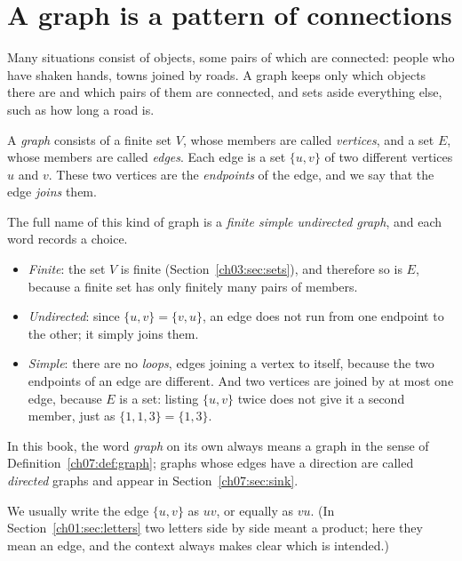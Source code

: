\section{A graph is a pattern of connections}\label{ch07:sec:graph}
Many situations consist of objects, some pairs of which are connected: people who have shaken hands, towns joined by roads. A graph keeps only which objects there are and which pairs of them are connected, and sets aside everything else, such as how long a road is.

\par\noindent\begin{minipage}{\linewidth}
\begin{definition}[Graph]\label{ch07:def:graph}
A \emph{graph} consists of a finite set $V$, whose members are called \emph{vertices}, and a set $E$, whose members are called \emph{edges}. Each edge is a set $\{u,v\}$ of two different vertices $u$ and $v$. These two vertices are the \emph{endpoints} of the edge, and we say that the edge \emph{joins} them.
\end{definition}
\end{minipage}\par

The full name of this kind of graph is a \emph{finite simple undirected graph}, and each word records a choice.
\begin{itemize}
\item \emph{Finite}: the set $V$ is finite (Section~\ref{ch03:sec:sets}), and therefore so is $E$, because a finite set has only finitely many pairs of members.
\item \emph{Undirected}: since $\{u,v\}=\{v,u\}$, an edge does not run from one endpoint to the other; it simply joins them.
\item \emph{Simple}: there are no \emph{loops}, edges joining a vertex to itself, because the two endpoints of an edge are different. And two vertices are joined by at most one edge, because $E$ is a set: listing $\{u,v\}$ twice does not give it a second member, just as $\{1,1,3\}=\{1,3\}$.
\end{itemize}
In this book, the word \emph{graph} on its own always means a graph in the sense of Definition~\ref{ch07:def:graph}; graphs whose edges have a direction are called \emph{directed} graphs and appear in Section~\ref{ch07:sec:sink}.

We usually write the edge $\{u,v\}$ as $uv$, or equally as $vu$. (In Section~\ref{ch01:sec:letters} two letters side by side meant a product; here they mean an edge, and the context always makes clear which is intended.)

